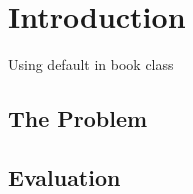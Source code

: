\documentclass{book}
\begin{document}
\chapter{Introduction}

Using default in book class

\section{The Problem}
\label{sec:problem}

\lipsum[1]

\section{Evaluation}

\lipsum
\end{document}
